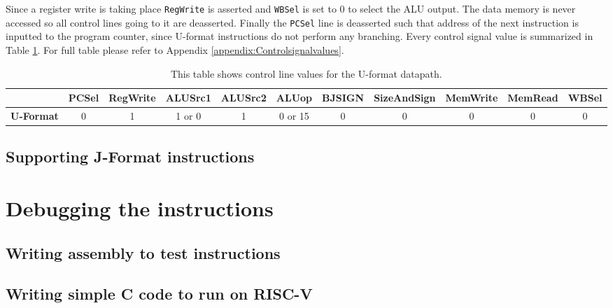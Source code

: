          Since a register write is taking place \texttt{RegWrite} is asserted and \texttt{WBSel} is set to 0 to select the ALU output. The data memory is never accessed so all control lines going to it are deasserted. Finally the \texttt{PCSel} line is deasserted such that address of the next instruction is inputted to the program counter, since U-format instructions do not perform any branching. Every control signal value is summarized in Table \ref{table:UFORMAT}. For full table please refer to Appendix \ref{appendix:Controlsignalvalues}.
    
        \begin{table}[h!]
            \small
            \hspace{-2.4cm}
            \begin{tabular}{|c||c|c|c|c|c|c|c|c|c|c|}
            	\hline
            	                  & \textbf{PCSel} & \textbf{RegWrite} & \textbf{ALUSrc1} & \textbf{ALUSrc2} & \textbf{ALUop} & \textbf{BJSIGN} & \textbf{SizeAndSign} & \textbf{MemWrite} & \textbf{MemRead} & \textbf{WBSel} \\ \hline\hline
            	\textbf{U-Format} &       0        &         1         &      1 or 0      &        1         &    0 or 15     &        0        &          0           &         0         &        0         &       0        \\ \hline
            \end{tabular}
            \caption{This table shows control line values for the U-format datapath.}
            \label{table:UFORMAT}
        \end{table}
    
    \subsection{Supporting J-Format instructions}
    
\section{Debugging the instructions}

    \subsection{Writing assembly to test instructions}
    
    \subsection{Writing simple C code to run on RISC-V}
    
    
    

    